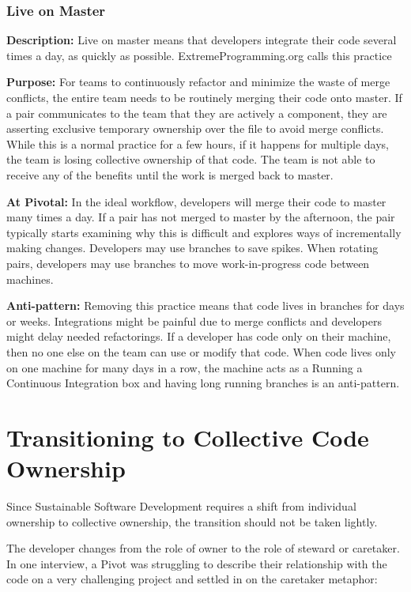\begin{table}[]
\subsubsection{Live on Master}
\textbf{Description:} Live on master means that developers integrate their code several times a day, as quickly as possible. ExtremeProgramming.org calls this practice  \cite{IntegrateOften} 

\textbf{Purpose:} For teams to continuously refactor and minimize the waste of merge conflicts, the entire team needs to be routinely merging their code onto master.  If a pair communicates to the team that they are actively  a component, they are asserting exclusive temporary ownership over the file to avoid merge conflicts. While this is a normal practice for a few hours, if it happens for multiple days, the team is losing collective ownership of that code. The team is not able to receive any of the benefits until the work is merged back to master. 

\textbf{At Pivotal:} In the ideal workflow, developers will merge their code to master many times a day. If a pair has not merged to master by the afternoon, the pair typically starts examining why this is difficult and explores ways of incrementally making changes. Developers may use branches to save spikes. When rotating pairs, developers may use branches to move work-in-progress code between machines.  

\textbf{Anti-pattern:} Removing this practice means that code lives in branches for days or weeks. Integrations might be painful due to merge conflicts and developers might delay needed refactorings. If a developer has code only on their machine, then no one else on the team can use or modify that code. When code lives only on one machine for many days in a row, the machine acts as a  Running a Continuous Integration box and having long running branches is an anti-pattern.
\section{Transitioning to Collective Code Ownership}
\label{Transitioning}
Since Sustainable Software Development requires a shift from individual ownership to collective ownership, the transition should not be taken lightly. 

The developer changes from the role of owner to the role of steward or caretaker. In one interview, a Pivot was struggling to describe their relationship with the code on a very challenging project and settled in on the caretaker metaphor: 


\end{table}
